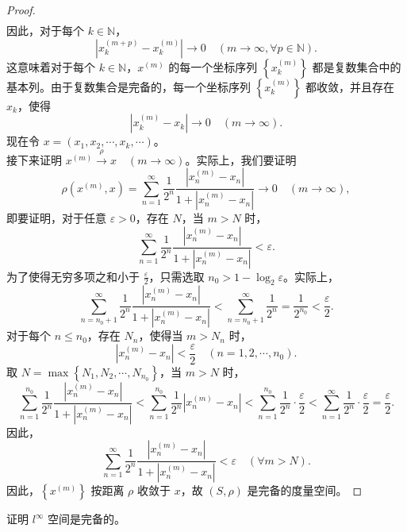 \documentclass[lang=cn,newtx,10pt,scheme=chinese,thmcnt=chapter]{elegantbook}
\begin{document}
\begin{proof}
\[\begin{aligned}
\end{aligned}
\]
因此，对于每个 \( k \in \mathbb{N} \)，
\[
\left|x_k^{(m+p)} - x_k^{(m)}\right| \to 0 \quad (m \to \infty, \forall p \in \mathbb{N}).
\]
这意味着对于每个 \( k \in \mathbb{N} \)，\( x^{(m)} \) 的每一个坐标序列 \( \left\{x_k^{(m)}\right\} \) 都是复数集合中的基本列。由于复数集合是完备的，每一个坐标序列 \( \left\{x_k^{(m)}\right\} \) 都收敛，并且存在 \( x_k \)，使得
\[
\left|x_k^{(m)} - x_k\right| \to 0 \quad (m \to \infty).
\]
现在令 \( x = \left(x_1, x_2, \cdots, x_k, \cdots\right) \)。\\
接下来证明 \( x^{(m)} \xrightarrow{\rho} x \quad (m \to \infty) \)。实际上，我们要证明
\[
\rho\left(x^{(m)}, x\right) = \sum_{n=1}^{\infty} \frac{1}{2^n} \frac{\left|x_n^{(m)} - x_n\right|}{1 + \left|x_n^{(m)} - x_n\right|} \to 0 \quad (m \to \infty),
\]
即要证明，对于任意 \( \varepsilon > 0 \)，存在 \( N \)，当 \( m > N \) 时，
\[
\sum_{n=1}^{\infty} \frac{1}{2^n} \frac{\left|x_n^{(m)} - x_n\right|}{1 + \left|x_n^{(m)} - x_n\right|} < \varepsilon.
\]
为了使得无穷多项之和小于 \( \frac{\varepsilon}{2} \)，只需选取 \( n_0 > 1 - \log_2 \varepsilon \)。实际上，
\[
\sum_{n=n_0+1}^{\infty} \frac{1}{2^n} \frac{\left|x_n^{(m)} - x_n\right|}{1 + \left|x_n^{(m)} - x_n\right|} < \sum_{n=n_0+1}^{\infty} \frac{1}{2^n} = \frac{1}{2^{n_0}} < \frac{\varepsilon}{2}.
\]
对于每个 \( n \leqslant n_0 \)，存在 \( N_n \)，使得当 \( m > N_n \) 时，
\[
\left|x_n^{(m)} - x_n\right| < \frac{\varepsilon}{2} \quad (n = 1, 2, \cdots, n_0).
\]
取 \( N = \max \left\{N_1, N_2, \cdots, N_{n_0}\right\} \)，当 \( m > N \) 时，
\[
\sum_{n=1}^{n_0} \frac{1}{2^n} \frac{\left|x_n^{(m)} - x_n\right|}{1 + \left|x_n^{(m)} - x_n\right|} < \sum_{n=1}^{n_0} \frac{1}{2^n} \left|x_n^{(m)} - x_n\right| < \sum_{n=1}^{n_0} \frac{1}{2^n} \cdot \frac{\varepsilon}{2} < \sum_{n=1}^{\infty} \frac{1}{2^n} \cdot \frac{\varepsilon}{2} = \frac{\varepsilon}{2}.
\]
因此，
\[
\sum_{n=1}^{\infty} \frac{1}{2^n} \frac{\left|x_n^{(m)} - x_n\right|}{1 + \left|x_n^{(m)} - x_n\right|} < \varepsilon \quad (\forall m > N).
\]
因此，\( \left\{x^{(m)}\right\} \) 按距离 \( \rho \) 收敛于 \( x \)，故 \( (S, \rho) \) 是完备的度量空间。
\end{proof}
\begin{example}
证明 \( l^\infty \) 空间是完备的。
\end{example}
\end{document}
